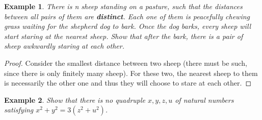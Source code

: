 \documentclass{article}
\newtheorem{theorem}{Example}
\begin{document}
\begin{theorem}
There is n sheep standing on a pasture, such that the distances between all pairs of them are \textbf{distinct}. Each one of them is peacefully chewing grass waiting for the shepherd dog to bark. Once the dog barks, every sheep will start staring at the nearest sheep. Show that after the bark, there is a pair of sheep awkwardly staring at each other.
\end{theorem}

\begin{proof}
Consider the smallest distance between two sheep (there must be such, since there is only finitely many sheep). For these two, the nearest sheep to them is necessarily the other one and thus they will choose to stare at each other.
\end{proof}



\break

\begin{theorem}
Show that there is no quadruple $x, y, z, u$ of natural numbers satisfying
$x^{2} + y^{2} = 3(z^{2} + u^{2})$.
\end{theorem}
\end{document}
